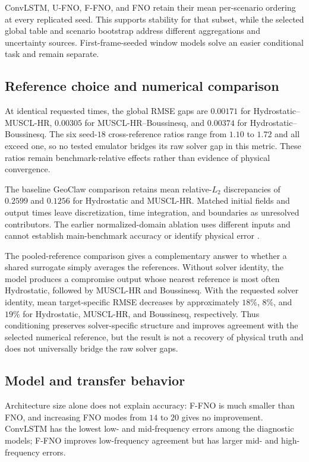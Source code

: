ConvLSTM, U-FNO, F-FNO, and FNO retain their mean per-scenario ordering at every replicated seed. This supports stability for that subset, while the selected global table and scenario bootstrap address different aggregations and uncertainty sources. First-frame-seeded window models solve an easier conditional task and remain separate.

\subsection{Reference choice and numerical comparison}
At identical requested times, the global RMSE gaps are $0.00171$ for Hydrostatic--MUSCL-HR, $0.00305$ for MUSCL-HR--Boussinesq, and $0.00374$ for Hydrostatic--Boussinesq. The six seed-$18$ cross-reference ratios range from $1.10$ to $1.72$ and all exceed one, so no tested emulator bridges its raw solver gap in this metric. These ratios remain benchmark-relative effects rather than evidence of physical convergence.

The baseline GeoClaw comparison retains mean relative-$L_2$ discrepancies of $0.2599$ and $0.1256$ for Hydrostatic and MUSCL-HR. Matched initial fields and output times leave discretization, time integration, and boundaries as unresolved contributors. The earlier normalized-domain ablation uses different inputs and cannot establish main-benchmark accuracy or identify physical error \citep{leveque2011tsunami,berger2011geoclaw}.

The pooled-reference comparison gives a complementary answer to whether a shared surrogate simply averages the references. Without solver identity, the model produces a compromise output whose nearest reference is most often Hydrostatic, followed by MUSCL-HR and Boussinesq. With the requested solver identity, mean target-specific RMSE decreases by approximately $18\%$, $8\%$, and $19\%$ for Hydrostatic, MUSCL-HR, and Boussinesq, respectively. Thus conditioning preserves solver-specific structure and improves agreement with the selected numerical reference, but the result is not a recovery of physical truth and does not universally bridge the raw solver gaps.

\subsection{Model and transfer behavior}
Architecture size alone does not explain accuracy: F-FNO is much smaller than FNO, and increasing FNO modes from $14$ to $20$ gives no improvement. ConvLSTM has the lowest low- and mid-frequency errors among the diagnostic models; F-FNO improves low-frequency agreement but has larger mid- and high-frequency errors.

